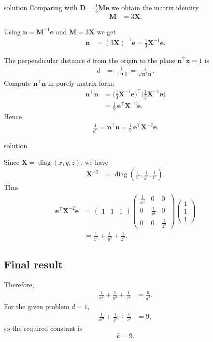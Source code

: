 \documentclass{beamer}
\numberwithin{equation}{section}
\theoremstyle{remark}
\newcommand{\myvec}[1]{\ensuremath{\begin{pmatrix}#1\end{pmatrix}}}
\let\vec\mathbf
\begin{document}
\begin{frame}{solution}
Comparing with $\vec{D}=\tfrac{1}{3}\mathbf{M}\vec{e}$ we obtain the matrix identity
\begin{align}
\mathbf{M} &= 3\mathbf{X}.
\end{align}

Using $\vec{n}=\mathbf{M}^{-1}\vec{e}$ and $\mathbf{M}=3\mathbf{X}$ we get
\begin{align}
\vec{n} &= (3\mathbf{X})^{-1}\vec{e}
      = \tfrac{1}{3}\mathbf{X}^{-1}\vec{e}.
\end{align}

The perpendicular distance \(d\) from the origin to the plane $\vec{n}^{\top}\vec{x}=1$ is
\begin{align}
d &= \frac{1}{\|\vec{n}\|}
   = \frac{1}{\sqrt{\vec{n}^{\top}\vec{n}}}.
\end{align}
Compute $\vec{n}^{\top}\vec{n}$ in purely matrix form:
\begin{align}
\vec{n}^{\top}\vec{n}
&= \Big(\tfrac{1}{3}\mathbf{X}^{-1}\vec{e}\Big)^{\top}
   \Big(\tfrac{1}{3}\mathbf{X}^{-1}\vec{e}\Big) \\
&= \tfrac{1}{9}\,\vec{e}^{\top}\mathbf{X}^{-2}\vec{e}.
\end{align}
Hence
\begin{align}
\frac{1}{d^2} = \vec{n}^{\top}\vec{n} = \tfrac{1}{9}\,\vec{e}^{\top}\mathbf{X}^{-2}\vec{e}.
\end{align}

\end{frame}
\begin{frame}{solution}

Since $\mathbf{X}=\operatorname{diag}(x,y,z)$, we have
\begin{align}
\mathbf{X}^{-2} &= \operatorname{diag}\!\left(\tfrac{1}{x^2},\tfrac{1}{y^2},\tfrac{1}{z^2}\right).
\end{align}
Thus
\begin{align}
\vec{e}^{\top}\mathbf{X}^{-2}\vec{e}
&= \myvec{1&1&1}
   \myvec{
     \tfrac{1}{x^2} & 0 & 0 \\
     0 & \tfrac{1}{y^2} & 0 \\
     0 & 0 & \tfrac{1}{z^2}
   }
   \myvec{1\\1\\1} \\
&= \tfrac{1}{x^2}+\tfrac{1}{y^2}+\tfrac{1}{z^2}.
\end{align}

\subsection*{Final result}

Therefore,
\begin{align}
\frac{1}{x^2}+\frac{1}{y^2}+\frac{1}{z^2} &= \frac{9}{d^2}.
\end{align}
For the given problem $d=1$,
\begin{align}
\frac{1}{x^2}+\frac{1}{y^2}+\frac{1}{z^2} &= 9,
\end{align}
so the required constant is
\[
\boxed{k=9}.
\]

\end{frame}
\end{document}

